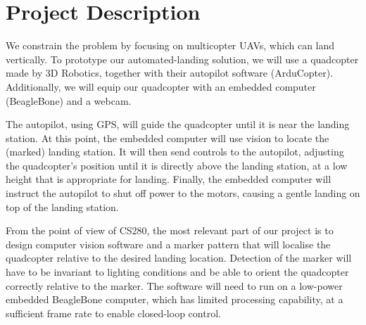 \section*{Project Description}

We constrain the problem by focusing on multicopter UAVs, which can land
vertically. To prototype our automated-landing solution, we will use a
quadcopter made by 3D Robotics, together with their autopilot software
(ArduCopter). Additionally, we will equip our quadcopter with an embedded
computer (BeagleBone) and a webcam.

The autopilot, using GPS, will guide the quadcopter until it is near the
landing station. At this point, the embedded computer will use vision to locate
the (marked) landing station. It will then send controls to the autopilot,
adjusting the quadcopter's position until it is directly above the landing
station, at a low height that is appropriate for landing. Finally, the embedded
computer will instruct the autopilot to shut off power to the motors, causing a
gentle landing on top of the landing station.

From the point of view of CS280, the most relevant part of our project is to
design computer vision software and a marker pattern that will localise the
quadcopter relative to the desired landing location. Detection of the marker
will have to be invariant to lighting conditions and be able to orient the
quadcopter correctly relative to the marker. The software will need to run on a
low-power embedded BeagleBone computer, which has limited processing
capability, at a sufficient frame rate to enable closed-loop control.
